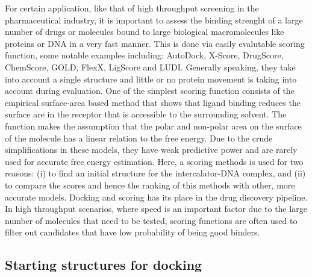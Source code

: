 For certain application, like that of high throughput screening in the pharmaceutical industry, it is important to assess the binding strenght of a large number of drugs or molecules bound to large biological macromolecules like proteins or DNA in a very fast manner. This is done via easily evalutable scoring function, some notable examples including: AutoDock, X-Score, DrugScore, ChemScore, GOLD, FlexX, LigScore and LUDI. Generally speaking, they take into account a single structure and little or no protein movement is taking into account during evaluation. One of the simplest scoring function  consists of the empirical surface-area based method that shows that ligand binding reduces the surface are in the receptor that is accessible to the surrounding solvent. The function makes the assumption that the polar and non-polar area on the surface of the molecule has a linear relation to the free energy. Due to the crude simplifications in these models, they have weak predictive power and are rarely used for accurate free energy estimation. Here, a scoring methods is used for two reasons: (i) to find an initial structure for the intercalator-DNA complex, and (ii) to compare the scores and hence the ranking of this methods with other, more accurate models. Docking and scoring has its place in the drug discovery pipeline. In high throughput scenarios, where speed is an important factor due to the large number of molecules that need to be tested, scoring functions are often used to filter out candidates that have low probability of being good binders.

\subsection{Starting structures for docking}








